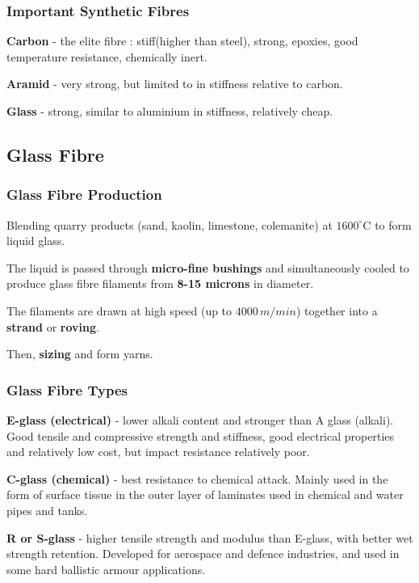 \documentclass{NoteThesis/note-thesis}
\begin{document}
\subsubsection*{Important Synthetic Fibres}

\textbf{Carbon} - the elite fibre : stiff(higher than steel), strong, epoxies, good temperature resistance, chemically inert.

\textbf{Aramid} - very strong, but limited to in stiffness relative to carbon. 

\textbf{Glass} - strong, similar to aluminium in stiffness, relatively cheap.

\subsection{Glass Fibre}

\subsubsection*{Glass Fibre Production}

Blending quarry products (sand, kaolin, limestone, colemanite) at $1600^\circ \text{C}$ to form liquid glass. 

The liquid is passed through \textbf{micro-fine bushings} and simultaneously cooled to produce glass fibre filaments from \textbf{8-15 microns} in diameter. 

The filaments are drawn at high speed (up to $4000\, m/min$) together into a \textbf{strand} or \textbf{roving}.

Then, \textbf{sizing} and form yarns.

\subsubsection*{Glass Fibre Types}

\textbf{E-glass (electrical)} - lower alkali content and stronger than A glass (alkali). Good tensile and compressive strength and stiffness, good electrical properties and relatively low cost, but impact resistance relatively poor.

\textbf{C-glass (chemical)} - best resistance to chemical attack. Mainly used in the form of surface tissue in the outer layer of laminates used in chemical and water pipes and tanks.

\textbf{R or S-glass} - higher tensile strength and modulus than E-glass, with better wet strength retention. Developed for aerospace and defence industries, and used in some hard ballistic
armour applications. 
\end{document}
